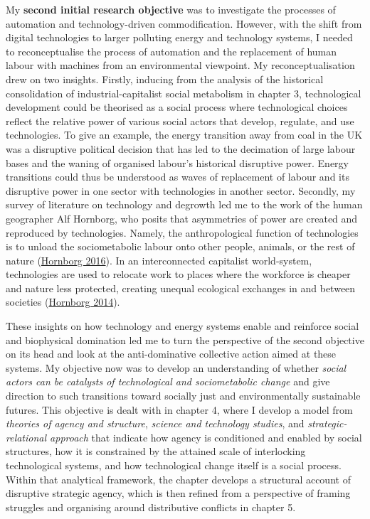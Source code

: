 \documentclass[a4paper, nobind]{templates/ociamthesis}
\begin{document}
My \textbf{second initial research objective} was to investigate the processes of automation and technology-driven commodification. However, with the shift from digital technologies to larger polluting energy and technology systems, I needed to reconceptualise the process of automation and the replacement of human labour with machines from an environmental viewpoint. My reconceptualisation drew on two insights. Firstly, inducing from the analysis of the historical consolidation of industrial-capitalist social metabolism in chapter 3, technological development could be theorised as a social process where technological choices reflect the relative power of various social actors that develop, regulate, and use technologies. To give an example, the energy transition away from coal in the UK was a disruptive political decision that has led to the decimation of large labour bases and the waning of organised labour's historical disruptive power. Energy transitions could thus be understood as waves of replacement of labour and its disruptive power in one sector with technologies in another sector. Secondly, my survey of literature on technology and degrowth led me to the work of the human geographer Alf Hornborg, who posits that asymmetries of power are created and reproduced by technologies. Namely, the anthropological function of technologies is to unload the sociometabolic labour onto other people, animals, or the rest of nature (\protect\hyperlink{ref-hornborg_global_2016}{Hornborg 2016}). In an interconnected capitalist world-system, technologies are used to relocate work to places where the workforce is cheaper and nature less protected, creating unequal ecological exchanges in and between societies (\protect\hyperlink{ref-hornborg_ecological_2014}{Hornborg 2014}).

These insights on how technology and energy systems enable and reinforce social and biophysical domination led me to turn the perspective of the second objective on its head and look at the anti-dominative collective action aimed at these systems. My objective now was to develop an understanding of whether \emph{social actors can be catalysts of technological and sociometabolic change} and give direction to such transitions toward socially just and environmentally sustainable futures. This objective is dealt with in chapter 4, where I develop a model from \emph{theories of agency and structure}, \emph{science and technology studies}, and \emph{strategic-relational approach} that indicate how agency is conditioned and enabled by social structures, how it is constrained by the attained scale of interlocking technological systems, and how technological change itself is a social process. Within that analytical framework, the chapter develops a structural account of disruptive strategic agency, which is then refined from a perspective of framing struggles and organising around distributive conflicts in chapter 5.
\end{document}
